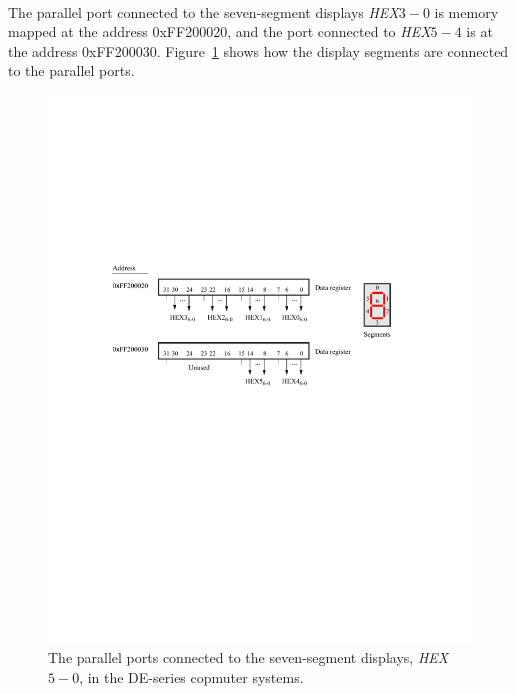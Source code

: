 \documentclass[epsfig,10pt,fullpage]{article}
\begin{document}
~\\
The parallel port connected to the 
seven-segment displays {\it HEX}$3-0$ is memory mapped at the address {\sf 0xFF200020}, 
and the port connected to {\it HEX}$5-4$ is at the address {\sf 0xFF200030}.
Figure~\ref{fig:HEX} shows how the display segments are connected to the parallel ports.  

\begin{figure}[H]
	\begin{center}
	\includegraphics[scale=1]{figures/figureHEX.pdf}
	\end{center}
	\caption{The parallel ports connected to the seven-segment displays, {\it HEX}$5-0$, in the DE-series copmuter systems.}
\label{fig:HEX}
\end{figure}
\end{document}
